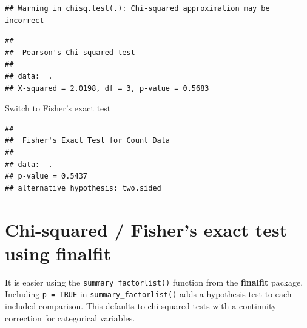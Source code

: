 \documentclass[
  12pt,
  krantz2]{krantz}
\makeatletter
\newenvironment{Shaded}{\begin{snugshade}}{\end{snugshade}}
\newcommand{\CommentTok}[1]{\textcolor[rgb]{0.56,0.35,0.01}{\textit{#1}}}
\newcommand{\KeywordTok}[1]{\textcolor[rgb]{0.13,0.29,0.53}{\textbf{#1}}}
\newcommand{\NormalTok}[1]{#1}
\newcommand{\OperatorTok}[1]{\textcolor[rgb]{0.81,0.36,0.00}{\textbf{#1}}}
\newcommand{\StringTok}[1]{\textcolor[rgb]{0.31,0.60,0.02}{#1}}
\newenvironment{kframe}{%
\medskip{}
\setlength{\fboxsep}{.8em}
 \def\at@end@of@kframe{}%
 \ifinner\ifhmode%
  \def\at@end@of@kframe{\end{minipage}}%
  \begin{minipage}{\columnwidth}%
 \fi\fi%
 \def\FrameCommand##1{\hskip\@totalleftmargin \hskip-\fboxsep
 \colorbox{shadecolor}{##1}\hskip-\fboxsep
     \hskip-\linewidth \hskip-\@totalleftmargin \hskip\columnwidth}%
 \MakeFramed {\advance\hsize-\width
   \@totalleftmargin\z@ \linewidth\hsize
   \@setminipage}}%
 {\par\unskip\endMakeFramed%
 \at@end@of@kframe}
\renewenvironment{Shaded}{\begin{kframe}}{\end{kframe}}
\makeatother
\begin{document}
\begin{Shaded}
\end{Shaded}

\begin{verbatim}
## Warning in chisq.test(.): Chi-squared approximation may be incorrect
\end{verbatim}

\begin{verbatim}
## 
##  Pearson's Chi-squared test
## 
## data:  .
## X-squared = 2.0198, df = 3, p-value = 0.5683
\end{verbatim}

Switch to Fisher's exact test

\begin{Shaded}
\end{Shaded}

\begin{verbatim}
## 
##  Fisher's Exact Test for Count Data
## 
## data:  .
## p-value = 0.5437
## alternative hypothesis: two.sided
\end{verbatim}


\hypertarget{chi-squared-fishers-exact-test-using-finalfit}{%
\section{Chi-squared / Fisher's exact test using finalfit}\label{chi-squared-fishers-exact-test-using-finalfit}}

It is easier using the \texttt{summary\_factorlist()} function from the \textbf{finalfit} package.
Including \texttt{p\ =\ TRUE} in \texttt{summary\_factorlist()} adds a hypothesis test to each included comparison.
This defaults to chi-squared tests with a continuity correction for categorical variables.
\end{document}
